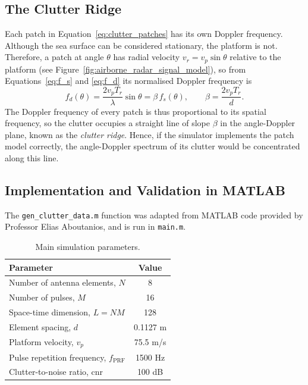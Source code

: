 \documentclass[12pt, a4paper]{report}
\begin{document}
\subsection{The Clutter Ridge}
\label{sec:clutter_ridge}
Each patch in Equation~\eqref{eq:clutter_patches} has its own Doppler frequency. Although the sea surface can be considered stationary, the platform is not. Therefore, a patch at angle $\theta$ has radial velocity $v_r=v_p\sin\theta$ relative to the platform (see Figure~\ref{fig:airborne_radar_signal_model}), so from Equations~\eqref{eq:f_s} and \eqref{eq:f_d} its normalised Doppler frequency is
\begin{equation}
    f_d(\theta) = \frac{2v_pT_r}{\lambda}\sin\theta = \beta\, f_s(\theta),
    \qquad \beta = \frac{2v_pT_r}{d}.
    \label{eq:clutter_ridge}
\end{equation}
The Doppler frequency of every patch is thus proportional to its spatial frequency, so the clutter occupies a straight line of slope $\beta$ in the angle-Doppler plane, known as the \emph{clutter ridge}. Hence, if the simulator implements the patch model correctly, the angle-Doppler spectrum of its clutter would be concentrated along this line.

\subsection{Implementation and Validation in MATLAB}\label{sec:sim_validation}
The \texttt{gen\_clutter\_data.m} function was adapted from MATLAB code provided by Professor Elias Aboutanios, and is run in \texttt{main.m}. 

\vspace{5mm}
\begin{table}[htbp]
    \centering
    \caption{Main simulation parameters.}
    \label{tab:sim_params}
    \begin{tabular}{@{}l c@{}}
        \hline
        Parameter & Value \\
        \hline
        Number of antenna elements, $N$ & 8 \\
        Number of pulses, $M$ & 16 \\
        Space-time dimension, $L=NM$ & 128 \\
        Element spacing, $d$ & 0.1127 \textrm{m} \\
        Platform velocity, $v_p$ & 75.5 \textrm{m/s} \\
        Pulse repetition frequency, $f_\mathrm{PRF}$ & 1500 \textrm{Hz} \\
        Clutter-to-noise ratio, \acrshort{cnr} & 100 \textrm{dB} \\
        \hline
    \end{tabular}
\end{table}
\vspace{5mm}
\end{document}
